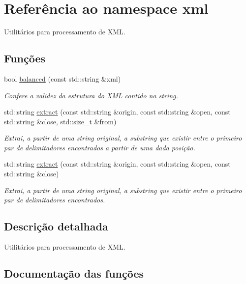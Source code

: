 \hypertarget{namespacexml}{}\section{Referência ao namespace xml}
\label{namespacexml}


Utilitários para processamento de X\+ML.  


\subsection*{Funções}
\begin{DoxyCompactItemize}
\item 
bool \mbox{\hyperlink{namespacexml_a3ef8f381726c12dd6126676f94f0e8eb}{balanced}} (const std\+::string \&xml)
\begin{DoxyCompactList}\small\item\em Confere a validez da estrutura do X\+ML contido na string. \end{DoxyCompactList}\item 
std\+::string \mbox{\hyperlink{namespacexml_a71783e2f9895997decf223259658b1d9}{extract}} (const std\+::string \&origin, const std\+::string \&open, const std\+::string \&close, std\+::size\+\_\+t \&from)
\begin{DoxyCompactList}\small\item\em Extrai, a partir de uma string original, a substring que existir entre o primeiro par de delimitadores encontrados a partir de uma dada posição. \end{DoxyCompactList}\item 
std\+::string \mbox{\hyperlink{namespacexml_a0737f196962e22c2120336ba27909da1}{extract}} (const std\+::string \&origin, const std\+::string \&open, const std\+::string \&close)
\begin{DoxyCompactList}\small\item\em Extrai, a partir de uma string original, a substring que existir entre o primeiro par de delimitadores encontrados. \end{DoxyCompactList}\end{DoxyCompactItemize}


\subsection{Descrição detalhada}
Utilitários para processamento de X\+ML. 

\subsection{Documentação das funções}
\mbox{\label{namespacexml_a3ef8f381726c12dd6126676f94f0e8eb}} 
